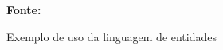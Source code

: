 \begin{figure}[h!]
\centering

\caption{\textmd{Exemplo de uso da linguagem de entidades}}
\label{fig:xtextprograma}

\par\medskip\textbf{Fonte:} \cite{xtextsite} \par\medskip
\end{figure}
